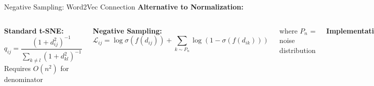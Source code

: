 \documentclass[aspectratio=169]{beamer}
\newcommand{\conceptbox}[2]{\colorbox{#1!20}{\textcolor{#1}{\textbf{#2}}}}
\newcommand{\insight}[1]{\conceptbox{blue}{Insight: #1}}
\begin{document}
\begin{frame}{Negative Sampling: Word2Vec Connection}
\textbf{Alternative to Normalization:}

\begin{columns}
\textbf{Standard t-SNE:}
$$q_{ij} = \frac{(1 + d_{ij}^2)^{-1}}{\sum_{k \neq l}(1 + d_{kl}^2)^{-1}}$$
Requires $O(n^2)$ for denominator

\textbf{Negative Sampling:}
$$\mathcal{L}_{ij} = \log \sigma(f(d_{ij})) + \sum_{k \sim P_n} \log(1 - \sigma(f(d_{ik})))$$

where $P_n$ = noise distribution

\textbf{Implementation:}
\begin{enumerate}
\item For each edge $(i,j)$
\item Sample $K$ negative points
\item Update via logistic function
\item No normalization needed!
\end{enumerate}

\textbf{Complexity:}
\begin{itemize}
\item Per iteration: $O(|E| \cdot K)$
\item Total: $O(n \cdot k \cdot K \cdot T)$
\end{itemize}

\insight{Trade statistical efficiency for computational speed}
\end{columns}
\end{frame}
\end{document}
